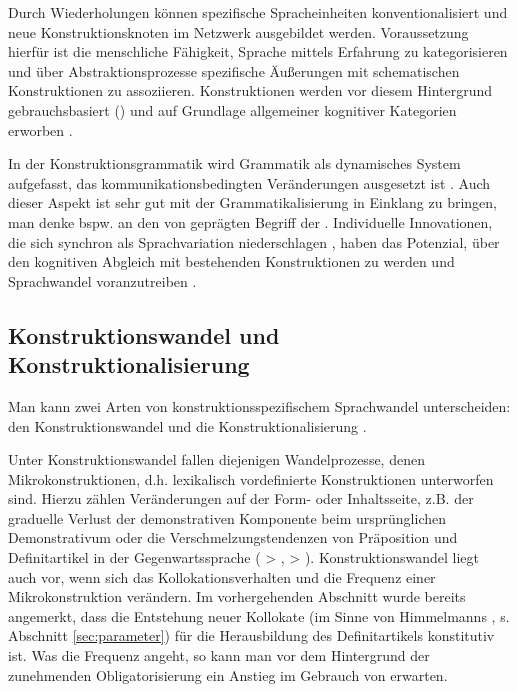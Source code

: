 Durch Wiederholungen können spezifische Spracheinheiten konventionalisiert und neue Konstruktionsknoten im Netzwerk ausgebildet werden. Voraussetzung hierfür ist die menschliche Fähigkeit, Sprache mittels Erfahrung zu kategorisieren und über Abstraktionsprozesse spezifische Äußerungen mit schematischen Konstruktionen zu assoziieren. Konstruktionen werden vor diesem Hintergrund gebrauchsbasiert () und auf Grundlage allgemeiner kognitiver Kategorien erworben \parencite[u.a.][]{Langacker1987,Goldberg2006,Bybee2006,Bybee2010,Bybee2013}.

In der Konstruktionsgrammatik wird Grammatik als dynamisches System aufgefasst, das kommunikationsbedingten Veränderungen ausgesetzt ist \parencite[35-36]{Imo2007}. Auch dieser Aspekt ist sehr gut mit der Grammatikalisierung in Einklang zu bringen, man denke bspw. an den von  \textcite{Hopper1991} geprägten Begriff der . Individuelle Innovationen, die sich synchron als Sprachvariation niederschlagen \parencite{Croft2010}, haben das Potenzial, über den kognitiven Abgleich mit bestehenden Konstruktionen  zu werden und Sprachwandel voranzutreiben \parencite[66]{Langacker1987}. 

\subsection{Konstruktionswandel und Konstruktionalisierung}\label{sec:konstruktionalisierung}

Man kann zwei Arten von konstruktionsspezifischem Sprachwandel unterscheiden: den Konstruktionswandel und die Konstruktionalisierung \parencite[vgl.][]{Hilpert2011,Hilpert2013,Fried2013,Traugott2013,Traugott2015,Trousdale2014}. 

Unter Konstruktionswandel fallen diejenigen Wandelprozesse, denen Mikrokonstruktionen, d.h. lexikalisch vordefinierte Konstruktionen unterworfen sind. Hierzu zählen Veränderungen auf der Form- oder Inhaltsseite, z.B. der graduelle Verlust der demonstrativen Komponente beim ursprünglichen Demonstrativum  oder die Verschmelzungstendenzen von Präposition und Definitartikel in der Gegenwartssprache ( > ,  > ). Konstruktionswandel liegt auch vor, wenn sich das Kollokationsverhalten und die Frequenz einer Mikrokonstruktion verändern. Im vorhergehenden Abschnitt wurde bereits angemerkt, dass die Entstehung neuer Kollokate (im Sinne von Himmelmanns  , s. Abschnitt \ref{sec:parameter}) für die Herausbildung des Definitartikels konstitutiv ist. Was die Frequenz angeht, so kann man vor dem Hintergrund der zunehmenden Obligatorisierung ein Anstieg im Gebrauch von  erwarten. 

